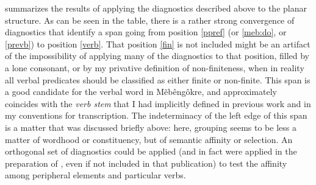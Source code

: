 \documentclass[output=paper]{langscibook}
\begin{document}
 summarizes the results of applying the diagnostics described above to the planar structure. As can be seen in the table, there is a rather strong convergence of diagnostics that identify a span going from position \ref{ppref} (or \ref{meb:do}, or \ref{prevb}) to position \ref{verb}. That position \ref{fin} is not included might be an artifact of the impossibility of applying many of the diagnostics to that position, filled by a lone consonant, or by my privative definition of non-finiteness, when in reality all verbal predicates should be classified as either finite or non-finite. This span is a good candidate for the verbal word in Mẽbêngôkre, and approximately coincides with the {\em verb stem} that I had implicitly defined in previous work and in my conventions for transcription. The indeterminacy of the left edge of this span is a matter that was discussed briefly above: here, grouping seems to be less a matter of wordhood or constituency, but of semantic affinity or selection. An orthogonal set of diagnostics could be applied (and in fact were applied in the preparation of \citealt{salanova:causative}, even if not included in that publication) to test the affinity among peripheral elements and particular verbs.

\end{document}

